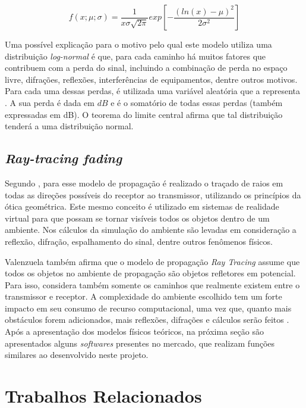 \documentclass[
	12pt,				%
	twoside,			%
	a4paper,			%
	english,			%
	french,				%
	spanish,			%
	brazil				%
	]{abntex2}
\begin{document}
\begin{equation}
    f(x; \mu; \sigma) = \frac{1}{x \sigma \sqrt{2 \pi}} exp\left[-\frac{(ln(x) - \mu)^{2}}{2 \sigma^{2}}\right]
\end{equation}

Uma possível explicação para o motivo pelo qual este modelo utiliza uma
distribuição \emph{log-normal} é que, para cada caminho há muitos
fatores que contribuem com a perda do sinal, incluindo a combinação de
perda no espaço livre, difrações, reflexões, interferências de
equipamentos, dentre outros motivos. Para cada uma dessas perdas, é
utilizada uma variável aleatória que a representa \cite{BUDGETS}. A sua
perda é dada em \(dB\) e é o somatório de todas essas perdas (também
expressadas em dB). O teorema do limite central afirma que tal
distribuição tenderá a uma distribuição normal.

\subsection{\texorpdfstring{\emph{Ray-tracing
fading}}{Ray-tracing fading}}\label{sec:ray_tracing}

Segundo \cite{VALENZUELA}, para esse modelo de propagação é realizado o
traçado de raios em todas as direções possíveis do receptor ao
transmissor, utilizando os princípios da ótica geométrica. Este mesmo
conceito é utilizado em sistemas de realidade virtual para que possam se
tornar visíveis todos os objetos dentro de um ambiente. Nos cálculos da
simulação do ambiente são levadas em consideração a reflexão, difração,
espalhamento do sinal, dentre outros fenômenos físicos.

Valenzuela também afirma que o modelo de propagação \emph{Ray Tracing}
assume que todos os objetos no ambiente de propagação são objetos
refletores em potencial. Para isso, considera também somente os caminhos
que realmente existem entre o transmissor e receptor. A complexidade do
ambiente escolhido tem um forte impacto em seu consumo de recurso
computacional, uma vez que, quanto mais obstáculos forem adicionados,
mais reflexões, difrações e cálculos serão feitos \cite{VALENZUELA}.
Após a apresentação dos modelos físicos teóricos, na próxima seção são
apresentados alguns \emph{softwares} presentes no mercado, que realizam
funções similares ao desenvolvido neste projeto.

\section{Trabalhos Relacionados}\label{trabalhos-relacionados}
\end{document}

